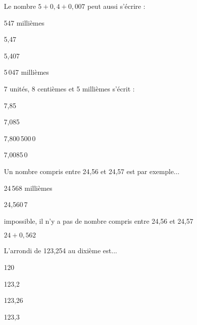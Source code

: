 \begin{QCM}
\begin{GroupeQCM}
    \begin{exercice}
      Le nombre $5 + 0,4 + 0,007$ peut aussi s'écrire :
      \begin{ChoixQCM}{4}
      \item 547 millièmes
      \item 5,47
      \item 5,407
      \item 5\,047 millièmes
      \end{ChoixQCM}
      \begin{corrige}
   \end{corrige}
    \end{exercice}
 
       \begin{exercice}
      7 unités, 8 centièmes et 5 millièmes s'écrit :
      \begin{ChoixQCM}{4}
      \item 7,85
      \item 7,085
      \item 7,800\,500\,0
      \item 7,0085\,0
      \end{ChoixQCM}
      \begin{corrige}
   \end{corrige}
    \end{exercice}


     \begin{exercice}
      Un nombre compris entre 24,56 et 24,57 est par exemple...
      \begin{ChoixQCM}{4}
      \item 24\,568 millièmes
      \item 24,560\,7
      \item impossible, il n'y a pas de nombre compris entre 24,56 et 24,57
      \item $24 + 0,562$
      \end{ChoixQCM}
      \begin{corrige}
   \end{corrige}
    \end{exercice}
    
     \begin{exercice}
      L'arrondi de 123,254 au dixième est...
      \begin{ChoixQCM}{4}
      \item 120
      \item 123,2
      \item 123,26
      \item 123,3
      \end{ChoixQCM}
      \begin{corrige}
   \end{corrige}
    \end{exercice}


\end{GroupeQCM}
\end{QCM}
